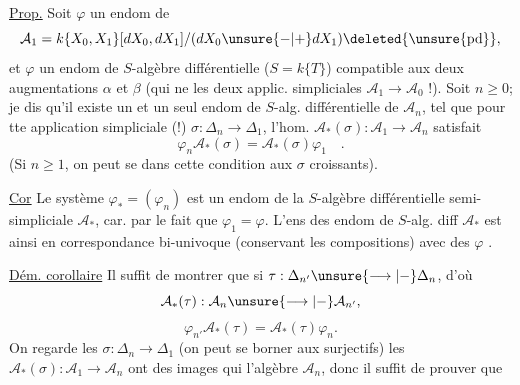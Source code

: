 \uline{Prop.} Soit $\varphi$ un endom de
\[
\mathcal A_1=k\{X_0,X_1\}[dX_0,dX_1]/(dX_0\unsure{-|+}dX_1)\deleted{\unsure{\mathrm{pd}}},
\]
et $\varphi$ \deleted{$\unsure{\varphi}$} un endom de $S$-algèbre différentielle ($S=k\{T\}$) compatible aux deux augmentations $\alpha$ et $\beta$ (qui ne  les deux applic. simpliciales $\mathcal A_1\longrightarrow\mathcal A_0$ !). Soit $n\ge0$; je dis qu'il existe un et un seul endom de $S$-alg. différentielle de $\mathcal A_n$,  tel que pour tte application simpliciale (!) $\sigma:\Delta_n\longrightarrow\Delta_1$, l'hom. $\mathcal A_*(\sigma):\mathcal A_1\to\mathcal A_n$ satisfait
\[
\varphi_n\mathcal A_*(\sigma)=\mathcal A_*(\sigma)\varphi_1\quad.
\]
 (Si $n\ge1$, on peut se   dans cette condition aux $\sigma$ croissants).


\uline{Cor}  Le système $\varphi_*=(\varphi_n)$ est un endom de la $S$-algèbre différentielle semi-simpliciale $\mathcal A_*$, car. \uline{} par le fait que $\varphi_1=\varphi$. L'ens des endom de $S$-alg. diff $\mathcal A_*$ est ainsi en correspondance bi-univoque (conservant les compositions) avec  des $\varphi$ .

\uline{Dém.  corollaire} Il suffit de montrer que si $\tau:\Delta_{n'}\unsure{\longrightarrow|-}\Delta_n$, d'où
\[
\mathcal A_*(\tau):\mathcal A_n\unsure{\longrightarrow|-}\mathcal A_{n'},
\]
\[
\varphi_{n'}\mathcal A_*(\tau)=\mathcal A_*(\tau)\varphi_n.
\]
On regarde les $\sigma:\Delta_n\longrightarrow\Delta_1$  (on peut se  borner aux surjectifs) les $\mathcal A_*(\sigma):\mathcal A_1\to\mathcal A_n$ ont des images qui  l'algèbre $\mathcal A_n$, donc il suffit de prouver que
